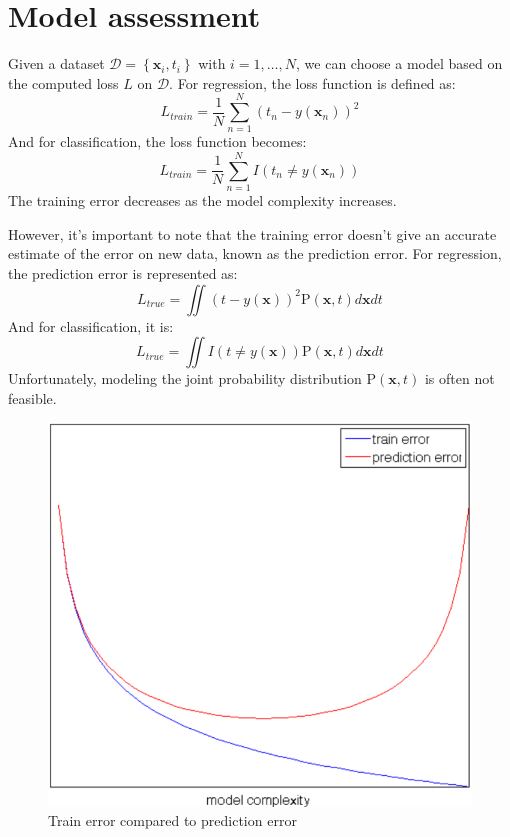 \section{Model assessment}

Given a dataset $\mathcal{D}=\left\{ \textbf{x}_i,t_i \right\}$ with $i=1,\ldots, N$, we can choose a model based on the computed loss $L$ on $\mathcal{D}$.
For regression, the loss function is defined as:
\[L_{train}=\dfrac{1}{N}\sum_{n=1}^N{\left(t_n-y(\textbf{x}_n)\right)}^2\]
And for classification, the loss function becomes:
\[L_{train}=\dfrac{1}{N}\sum_{n=1}^N I(t_n \neq y(\textbf{x}_n))\]
The training error decreases as the model complexity increases.

However, it's important to note that the training error doesn't give an accurate estimate of the error on new data, known as the prediction error.
For regression, the prediction error is represented as:
\[L_{true}=\iint{\left( t-y(\textbf{x})\right)}^2\text{P}(\textbf{x},t)d\textbf{x}dt \]
And for classification, it is:
\[L_{true}=\iint I(t\neq y(\textbf{x}))\text{P}(\textbf{x},t)d\textbf{x}dt \]
Unfortunately, modeling the joint probability distribution $\text{P}(\textbf{x},t)$ is often not feasible.
\begin{figure}[H]
    \centering
    \includegraphics[width=0.35\linewidth]{images/error.png}
    \caption{Train error compared to prediction error}
\end{figure}

